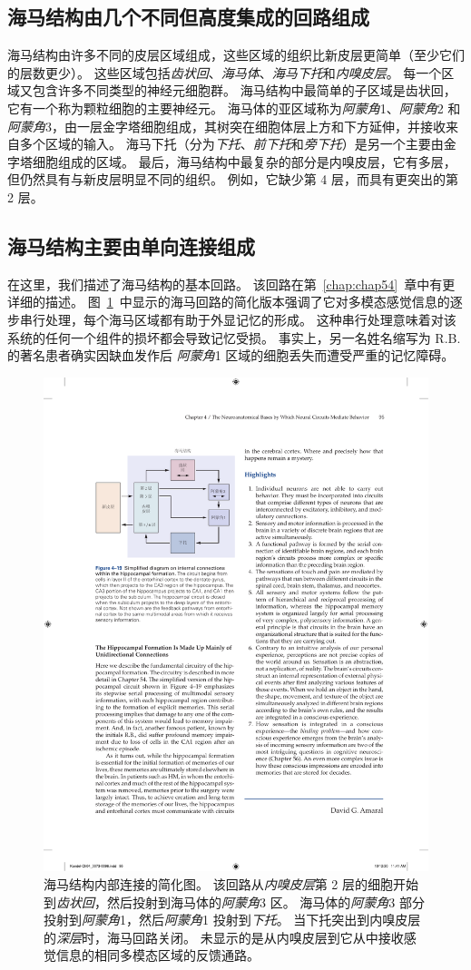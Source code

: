 \subsection{海马结构由几个不同但高度集成的回路组成}

海马结构由许多不同的皮层区域组成，这些区域的组织比新皮层更简单（至少它们的层数更少）。
这些区域包括\textit{齿状回}、\textit{海马体}、\textit{海马下托}和\textit{内嗅皮层}。 
每一个区域又包含许多不同类型的神经元细胞群。
海马结构中最简单的子区域是齿状回，它有一个称为颗粒细胞的主要神经元。
海马体的亚区域称为\textit{阿蒙角}1、\textit{阿蒙角}2 和\textit{阿蒙角}3，由一层金字塔细胞组成，其树突在细胞体层上方和下方延伸，并接收来自多个区域的输入。
海马下托（分为\textit{下托}、\textit{前下托}和\textit{旁下托}）是另一个主要由金字塔细胞组成的区域。
最后，海马结构中最复杂的部分是内嗅皮层，它有多层，但仍然具有与新皮层明显不同的组织。
例如，它缺少第 4 层，而具有更突出的第 2 层。



\subsection{海马结构主要由单向连接组成}

在这里，我们描述了海马结构的基本回路。
该回路在第~\ref{chap:chap54}~章中有更详细的描述。
图~\ref{fig:4_19}~中显示的海马回路的简化版本强调了它对多模态感觉信息的逐步串行处理，每个海马区域都有助于外显记忆的形成。
这种串行处理意味着对该系统的任何一个组件的损坏都会导致记忆受损。
事实上，另一名姓名缩写为 R.B. 的著名患者确实因缺血发作后 \textit{阿蒙角}1 区域的细胞丢失而遭受严重的记忆障碍。


\begin{figure}[htbp]
	\centering
	\includegraphics[width=0.6\linewidth]{chap04/fig_4_19}
	\caption{海马结构内部连接的简化图。 
		该回路从\textit{内嗅皮层}第 2 层的细胞开始到\textit{齿状回}，然后投射到海马体的\textit{阿蒙角}3 区。
		海马体的\textit{阿蒙角}3 部分投射到\textit{阿蒙角}1，然后\textit{阿蒙角}1 投射到\textit{下托}。
		当下托突出到内嗅皮层的\textit{深层}时，海马回路关闭。
		未显示的是从内嗅皮层到它从中接收感觉信息的相同多模态区域的反馈通路。}
	\label{fig:4_19}
\end{figure}


